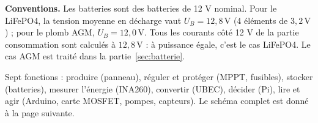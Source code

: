 \documentclass[11pt,a4paper]{article}
\newcommand{\U}[1]{\,\mathrm{#1}}
\begin{document}
\begin{center}
\end{center}

\textbf{Conventions.} Les batteries sont des batteries de 12 V nominal. Pour le LiFePO4, la tension moyenne en décharge vaut $U_B = 12{,}8\U{V}$ (4 éléments de $3{,}2\U{V}$) ; pour le plomb AGM, $U_B = 12{,}0\U{V}$. Tous les courants côté 12 V de la partie consommation sont calculés à $12{,}8\U{V}$ : à puissance égale, c'est le cas LiFePO4. Le cas AGM est traité dans la partie~\ref{sec:batterie}.

\begin{resume}
Sept fonctions : produire (panneau), réguler et protéger (MPPT, fusibles), stocker (batteries), mesurer l'énergie (INA260), convertir (UBEC), décider (Pi), lire et agir (Arduino, carte MOSFET, pompes, capteurs). Le schéma complet est donné à la page suivante.
\end{resume}
\end{document}
